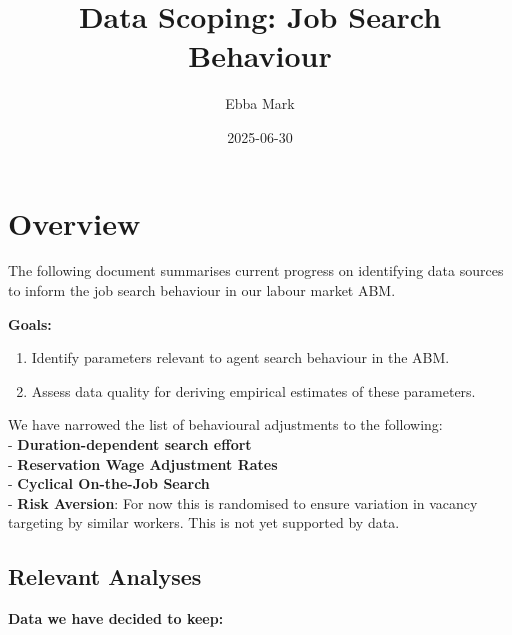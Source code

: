\documentclass[
]{article}
\title{Data Scoping: Job Search Behaviour}
\author{Ebba Mark}
\date{2025-06-30}
\begin{document}
\maketitle

\section{Overview}\label{overview}

The following document summarises current progress on identifying data
sources to inform the job search behaviour in our labour market ABM.

\textbf{Goals:}

\begin{enumerate}
\def\labelenumi{\arabic{enumi}.}
\item
  Identify parameters relevant to agent search behaviour in the ABM.
\item
  Assess data quality for deriving empirical estimates of these
  parameters.
\end{enumerate}

We have narrowed the list of behavioural adjustments to the following:\\
- \textbf{Duration-dependent search effort}\\
- \textbf{Reservation Wage Adjustment Rates}\\
- \textbf{Cyclical On-the-Job Search}\\
- \textbf{Risk Aversion}: For now this is randomised to ensure variation
in vacancy targeting by similar workers. This is not yet supported by
data.

\subsection{\texorpdfstring{\textbf{Relevant
Analyses}}{Relevant Analyses}}\label{relevant-analyses}

\textbf{Data we have decided to keep:}
\end{document}
